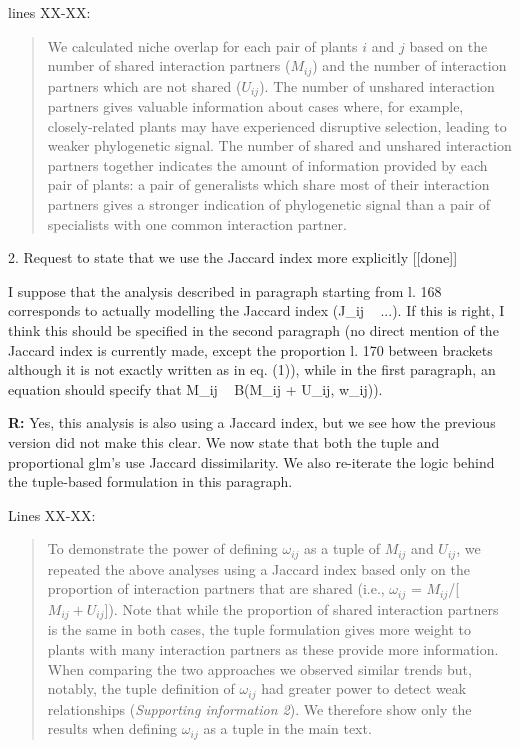 \documentclass[12pt]{letter}
\newenvironment{refquote}{\bigskip \begin{it}}{\end{it}\smallskip}
\begin{document}
	lines XX-XX:


	\begin{quotation}

	    We calculated niche overlap for each pair of plants $i$ and $j$ based on the number of shared interaction
	    partners ($M_{ij}$) and the number of interaction partners which are not
	    shared ($U_{ij}$). The number of unshared interaction 
	    partners gives valuable information about cases where, for example, 
	    closely-related plants may have experienced disruptive selection, leading to weaker phylogenetic signal. The number of shared and unshared interaction partners together indicates the amount of information  provided by each pair of plants: a pair of generalists which share most of their interaction partners gives a stronger indication of phylogenetic signal than a pair of specialists with one common interaction partner.

	\end{quotation} 


2. Request to state that we use the Jaccard index more explicitly [[done]]

	\begin{refquote}
		I suppose that the analysis described in paragraph starting from l. 168 corresponds to actually modelling the Jaccard index (J_ij ~ ...). If this is right, I think this should be specified in the second paragraph (no direct mention of the Jaccard index is currently made, except the proportion l. 170 between brackets although it is not exactly written as in eq. (1)), while in the first paragraph, an equation should specify that M_ij ~ B(M_ij + U_ij, w_ij)).
	\end{refquote}


	\textbf{R:} Yes, this analysis is also using a Jaccard index, but we see how the previous version did not make this clear. We now state that both the tuple and proportional glm's use Jaccard dissimilarity. We also re-iterate the logic behind the tuple-based formulation in this paragraph.


		Lines XX-XX:


		\begin{quotation}

			To demonstrate the power of defining $\omega_{ij}$ as a tuple of $M_{ij}$ and $U_{ij}$, we repeated the above analyses using a Jaccard index based only on the proportion of interaction partners that are shared (i.e., $\omega_{ij}$ = $M_{ij}$/[$M_{ij}+U_{ij}$]). Note that while the proportion of shared interaction partners is the same in both cases, the tuple formulation gives more weight to plants with many interaction partners as these provide more information. When comparing the two approaches 
		    we observed similar trends but, notably, the tuple definition of $\omega_{ij}$ had greater power to detect weak relationships (\emph{Supporting information 2}). We therefore show only the results when defining $\omega_{ij}$ as a tuple in the main text.

		\end{quotation}
\end{document}
